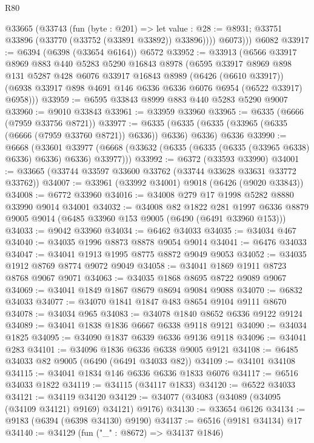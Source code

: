 \begin{lexlean}{R80}
\begin{coremodule}
        @33665
          (@33743
            (fun (byte : @201) =>
            let value : @28 := @8931; @33751 @33896 (@33770 (@33752 (@33891 @33892)) @33896))))
          @6073)))
    @6082
@33917 := @6394 (@6398 (@33654 @6164)) @6572
@33952 := @33913
    (@6566
      @33917
      @8969
      @883
      @440
      @5283
      @5290
      @16843
      @8978
      (@6595
        @33917
        @8969
        @898
        @131
        @5287
        @428
        @6076
        @33917
        @16843
        @8989
        (@6426 (@6610 @33917))
        (@6938 @33917 @898 @4691 @146 @6336 @6336 @6076 @6954 (@6522 @33917) @6958)))
@33959 := @6595 @33843 @8999 @883 @440 @5283 @5290 @9007
@33960 := @9010 @33843
@33961 := @33959 @33960
@33965 := @6335 (@6666 (@7959 @33756 @8721))
@33977 := @6335
    (@6335 (@6335 (@33965 (@6335 (@6666 (@7959 @33760 @8721)) @6336)) @6336) @6336)
    @6336
@33990 := @6668
    (@33601 @33977 (@6668 (@33632 (@6335 (@6335 (@6335 (@33965 @6338) @6336) @6336) @6336) @33977)))
@33992 := @6372 (@33593 @33990)
@34001 := @33665 (@33744 @33597 @33600 @33762 (@33744 @33628 @33631 @33772 @33762))
@34007 := @33961 (@33992 @34001) @9018 (@6426 (@9020 @33843))
@34008 := @6772 @33960
@34016 := @34008 @279 @17 @1998 @5282 @8880 @33990 @9014 @34001
@34032 := @34008
    @82
    @1822
    @281
    @1997
    @6336
    @8879
    @9005
    @9014
    (@6485 @33960 @153 @9005 (@6490 (@6491 @33960 @153)))
@34033 := @9042 @33960
@34034 := @6462 @34033
@34035 := @34034 @467
@34040 := @34035 @1996 @8873 @8878 @9054 @9014
@34041 := @6476 @34033
@34047 := @34041 @1913 @1995 @8775 @8872 @9049 @9053
@34052 := @34035 @1912 @8769 @8774 @9072 @9049
@34058 := @34041 @1869 @1911 @8723 @8768 @9067 @9071
@34063 := @34035 @1868 @8695 @8722 @9089 @9067
@34069 := @34041 @1849 @1867 @8679 @8694 @9084 @9088
@34070 := @6832 @34033
@34077 := @34070 @1841 @1847 @483 @8654 @9104 @9111 @8670
@34078 := @34034 @965
@34083 := @34078 @1840 @8652 @6336 @9122 @9124
@34089 := @34041 @1838 @1836 @6667 @6338 @9118 @9121
@34090 := @34034 @1825
@34095 := @34090 @1837 @6339 @6336 @9136 @9118
@34096 := @34041 @283
@34101 := @34096 @1836 @6336 @6338 @9005 @9121
@34108 := @6485 @34033 @82 @9005 (@6490 (@6491 @34033 @82))
@34109 := @34101 @34108
@34115 := @34041 @1834 @146 @6336 @6336 @1833 @6076
@34117 := @6516 @34033 @1822
@34119 := @34115 (@34117 @1833)
@34120 := @6522 @34033
@34121 := @34119 @34120
@34129 := @34077 (@34083 (@34089 (@34095 (@34109 @34121) @9169) @34121) @9176)
@34130 := @33654 @6126
@34134 := @9183 (@6394 (@6398 @34130) @9190)
@34137 := @6516 (@9181 @34134) @17
@34140 := @34129 (fun ("_" : @8672) => @34137 @1846)

\end{coremodule}
\end{lexlean}
